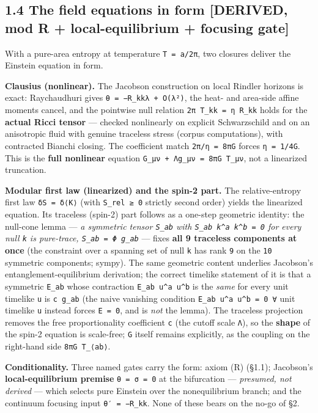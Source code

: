 \documentclass[11pt]{article}
\begin{document}
\subsection*{1.4 The field equations in form [DERIVED, mod R + local-equilibrium + focusing gate]}
With a pure-area entropy at temperature \texttt{T = a/2π}, two closures deliver the Einstein equation in form.

\textbf{Clausius (nonlinear).} The Jacobson construction on local Rindler horizons is exact: Raychaudhuri gives \texttt{θ = −R\_{kk}λ + O(λ²)}, the heat- and area-side affine moments cancel, and the pointwise null relation \texttt{2π T\_{kk} = η R\_{kk}} holds for the \textbf{actual Ricci tensor} — checked nonlinearly on explicit Schwarzschild and on an anisotropic fluid with genuine traceless stress (corpus computations), with contracted Bianchi closing. The coefficient match \texttt{2π/η = 8πG} forces \texttt{η = 1/4G}. This is the \textbf{full nonlinear} equation \texttt{G\_μν + Λg\_μν = 8πG T\_μν}, not a linearized truncation.

\textbf{Modular first law (linearized) and the spin-2 part.} The relative-entropy first law \texttt{δS = δ⟨K⟩} (with \texttt{S\_rel ≥ 0} strictly second order) yields the linearized equation. Its traceless (spin-2) part follows as a one-step geometric identity: the null-cone lemma — \emph{a symmetric tensor \texttt{S\_ab} with \texttt{S\_ab k\textasciicircum{}a k\textasciicircum{}b = 0} for every null \texttt{k} is pure-trace, \texttt{S\_ab = Φ g\_ab}} — fixes \textbf{all 9 traceless components at once} (the constraint over a spanning set of null \texttt{k} has rank \texttt{9} on the \texttt{10} symmetric components; sympy). The same geometric content underlies Jacobson's entanglement-equilibrium derivation; the correct timelike statement of it is that a symmetric \texttt{E\_ab} whose contraction \texttt{E\_ab u\textasciicircum{}a u\textasciicircum{}b} is the \emph{same} for every unit timelike \texttt{u} is \texttt{c g\_ab} (the naive vanishing condition \texttt{E\_ab u\textasciicircum{}a u\textasciicircum{}b = 0 ∀} unit timelike \texttt{u} instead forces \texttt{E = 0}, and is \emph{not} the lemma). The traceless projection removes the free proportionality coefficient \texttt{c} (the cutoff scale \texttt{Λ}), so the \textbf{shape} of the spin-2 equation is scale-free; \texttt{G} itself remains explicitly, as the coupling on the right-hand side \texttt{8πG T\_{⟨ab⟩}}.

\textbf{Conditionality.} Three named gates carry the form: axiom (R) (§1.1); Jacobson's \textbf{local-equilibrium premise} \texttt{θ = σ = 0} at the bifurcation — \emph{presumed, not derived} — which selects pure Einstein over the nonequilibrium branch; and the continuum focusing input \texttt{θ′ = −R\_{kk}}. None of these bears on the no-go of §2.
\end{document}
